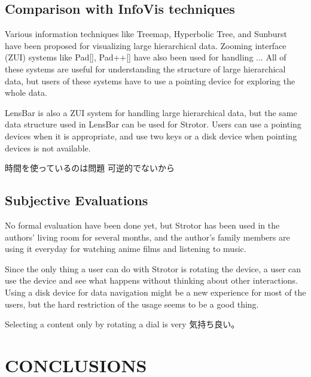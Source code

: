 \documentclass{article}
\begin{document}
\subsection{Comparison with InfoVis techniques}

Various information techniques like
Treemap\cite{Johnson:1991:TSA:949607.949654},
Hyperbolic Tree\cite{Lamping:1995:FTB:223904.223956},
and Sunburst\cite{Stasko:2000:FDN:857190.857683}
have been proposed for visualizing large hierarchical data.
Zooming interface (ZUI) systems like Pad[], Pad++[]
have also been used for handling ...
All of these systems are useful for understanding the structure of
large hierarchical data, but users of these systems have to use a pointing device
for exploring the whole data.

LensBar\cite{Masui:1998:LVB:647341.721215}
is also a ZUI system for handling large hierarchical data,
but the same data structure used in LensBar can be used for Strotor.
Users can use a pointing devices when it is appropriate,
and use two keys or a disk device when pointing devices is not available.

時間を使っているのは問題
可逆的でないから

\subsection{Subjective Evaluations}

No formal evaluation have been done yet, but Strotor has been used in the authors'
living room for several months, and the author's family members are using it
everyday for watching anime films and listening to music.

Since the only thing a user can do with Strotor is rotating the device,
a user can use the device and see what happens without thinking about
other interactions.
Using a disk device for data navigation might be a new experience for
most of the users, but the hard restriction of the usage seems to be a
good thing.

Selecting a content only by rotating a dial is very 気持ち良い。


\section*{CONCLUSIONS}




\end{document}
